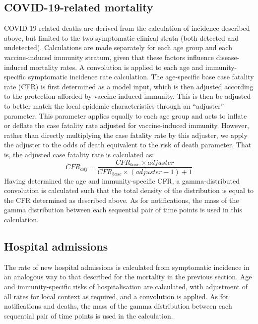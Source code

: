 \subsection{COVID-19-related mortality}
COVID-19-related deaths are derived from the calculation of incidence described above,
but limited to the two symptomatic clinical strata (both detected and undetected).
Calculations are made separately for each age group and each vaccine-induced immunity stratum, 
given that these factors influence disease-induced mortality rates.
A convolution is applied to each age and immunity-specific 
symptomatic incidence rate calculation.
The age-specific base case fatality rate (CFR) 
is first determined as a model input,  %
which is then adjusted according to the protection afforded by vaccine-induced immunity.
This is then be adjusted to better match the local epidemic characteristics through an
``adjuster'' parameter.
This parameter applies equally to each age group 
and acts to inflate or deflate the case fatality rate
adjusted for vaccine-induced immunity.
However, rather than directly multiplying the case fatality rate by this adjuster,
we apply the adjuster to the odds of death equivalent to the risk of death parameter.
That is, the adjusted case fatality rate is calculated as:
\[CFR_{adj} = \frac{CFR_{base} \times adjuster}{CFR_{base} \times (adjuster - 1) + 1}\]
Having determined the age and immunity-specific CFR,
a gamma-distributed convolution is calculated such that the total density
of the distribution is equal to the CFR determined as described above.  %
As for notifications, the mass of the gamma distribution 
between each sequential pair of time points is
used in this calculation.

\subsection{Hospital admissions}
The rate of new hospital admissions is calculated from symptomatic incidence in 
an analogous way to that described for the mortality in the previous section.
Age and immunity-specific risks of hospitalisation are calculated,
with adjustment of all rates for local context as required, and a convolution is applied.
As for notifications and deaths, the mass of the gamma distribution 
between each sequential pair of time points is
used in the calculation.

